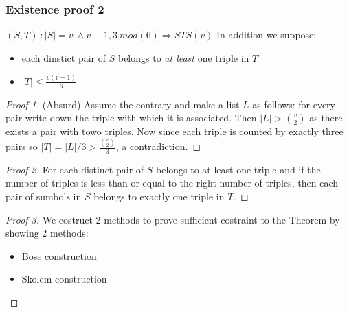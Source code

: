 \begin{frame}
\frametitle{Existence proof 2}
\begin{block}{$(S,T)\ : |S|=v\ \wedge v\equiv 1,3\ mod(6) \Rightarrow STS(v)$}
	In addition we suppose:
	\begin{itemize}
		\item each dinstict pair of $S$ belongs to \textit{at least} one triple in $T$
		\item $|T| \le \frac{v(v-1)}{6}$
	\end{itemize}
\end{block}
\begin{proof}[Proof 1]
	(Absurd) Assume the contrary and make a list $L$ as follows: for every pair write down the triple with which it is associated. Then $|L|> \binom{v}{2}$ as there exists a pair with towo triples. Now since each triple is counted by exactly three pairs so $|T| =|L|/3 > \frac{\binom{v}{2}}{3}$, a contradiction.
\end{proof}


\end{frame}

\begin{frame}
\begin{proof}[Proof 2]
	For each distinct pair of $S$ belongs to at least one triple and if the number of triples is less than or equal to the right number of triples, then each pair of sumbols in $S$ belongs to exactly one triple in $T$.
\end{proof}

\begin{proof}[Proof 3]
	We costruct 2 methods to prove sufficient costraint to the Theorem by showing 2 methods:
	\begin{itemize}
		\item Bose construction
		\item Skolem construction
	\end{itemize}
\end{proof}
\end{frame}